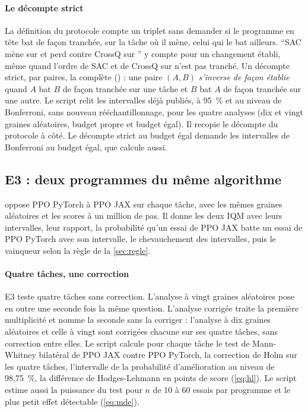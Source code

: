 \paragraph{Le décompte strict}
La définition du protocole compte un triplet sans demander si le programme en tête bat de façon tranchée,
sur la tâche où il mène, celui qui le bat ailleurs. \enquote{SAC mène sur  et perd contre CrossQ sur
} y compte pour un changement établi, même quand l'ordre de SAC et de CrossQ sur
 n'est pas tranché. Un décompte strict, par paires, la complète
() : une paire $(A,B)$ \emph{s'inverse de façon établie} quand $A$ bat $B$ de
façon tranchée sur une tâche et $B$ bat $A$ de façon tranchée sur une autre. Le script relit les intervalles
déjà publiés, à 95~\% et au niveau de Bonferroni, sans nouveau rééchantillonnage, pour les quatre analyses (dix
et vingt graines aléatoires, budget propre et budget égal). Il recopie le décompte du protocole à côté. Le
décompte strict au budget égal demande les intervalles de Bonferroni au budget égal, que 
calcule aussi.

\subsection{E3 : deux programmes du même algorithme}\label{sec:plan-e3}
 oppose PPO PyTorch à PPO JAX sur chaque tâche, avec les mêmes graines aléatoires et
les scores à un million de pas. Il donne les deux IQM avec leurs intervalles, leur rapport, la
probabilité qu'un essai de PPO JAX batte un essai de PPO PyTorch avec son intervalle, le chevauchement des
intervalles, puis le vainqueur selon la règle de la \cref{sec:regle}.

\paragraph{Quatre tâches, une correction}
E3 teste quatre tâches sans correction. L'analyse à vingt graines aléatoires pose en outre une seconde fois la
même question. L'analyse corrigée traite la première multiplicité et nomme la seconde sans la corriger :
l'analyse à dix graines aléatoires et celle à vingt sont corrigées chacune sur ses quatre tâches, sans correction
entre elles. Le script  calcule pour chaque tâche
le test de Mann-Whitney bilatéral de PPO JAX contre PPO PyTorch, la correction de Holm sur les quatre tâches,
l'intervalle de la probabilité d'amélioration au niveau de 98,75~\%, la différence de Hodges-Lehmann en points de
score (\cref{eq:hl}). Le script estime aussi la puissance du test pour $n$ de 10 à 60 essais par programme
et le plus petit effet détectable (\cref{eq:mde}).

